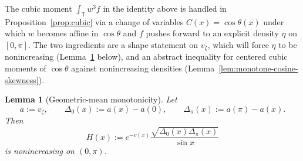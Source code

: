 \documentclass{amsart}
\newtheorem{lemma}[theorem]{Lemma}
\newcommand{\T}{\mathbb T}
\begin{document}
The cubic moment $\int_\T w^3 f$ in the identity above is handled in
Proposition~\ref{prop:cubic} via a change of variables
$C(x)=\cos\theta(x)$ under which $w$ becomes affine in $\cos\theta$
and $f$ pushes forward to an explicit density $\eta$ on $[0,\pi]$. The
two ingredients are a shape statement on $v_\zeta$, which will force
$\eta$ to be nonincreasing (Lemma~\ref{lem:geometric-mean} below), and
an abstract inequality for centered cubic moments of $\cos\theta$
against nonincreasing densities (Lemma~\ref{lem:monotone-cosine-skewness}).

\begin{lemma}[Geometric-mean monotonicity]\label{lem:geometric-mean}
Let
\[
a:=v_\zeta,\qquad
\Delta_0(x):=a(x)-a(0),\qquad \Delta_\pi(x):=a(\pi)-a(x).
\]
Then
\[
H(x):=e^{-v(x)}\frac{\sqrt{\Delta_0(x)\Delta_\pi(x)}}{\sin x}
\]
is nonincreasing on $(0,\pi)$.
\end{lemma}
\end{document}
